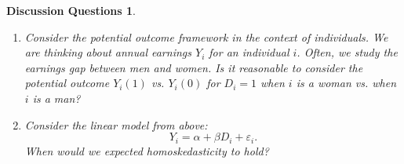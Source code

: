 \documentclass{tufte-handout}
\theoremstyle{break}
\newtheorem{discussion}{Discussion Questions}
\begin{document}
\begin{boxK}
  \begin{discussion}
    \begin{enumerate}
      \item Consider the potential outcome framework in the context of individuals. We are thinking about annual earnings $Y_{i}$ for an individual $i$. 
      Often, we study the earnings gap between men and women. Is it reasonable to consider the potential outcome $Y_{i}(1)$ vs. $Y_{i}(0)$ for $D_{i} =1$ when $i$ is a woman vs. when $i$ is a man?
      \item Consider the linear model  from above:
      \begin{equation*}
  Y_{i} = \alpha + \beta D_{i} + \varepsilon_{i}.
      \end{equation*}
      When would we expected homoskedasticity to hold? 
    \end{enumerate}
  \end{discussion}
\end{boxK}




\end{document}
